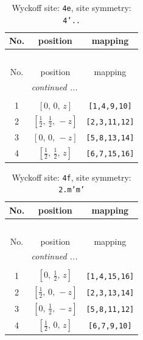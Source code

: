\documentclass[fleqn,8pt]{jsarticle}
\begin{document}
\begin{longtable}{ccc}
\caption{Wyckoff site: {\tt 4e}, site symmetry: {\tt 4'..}}
 \\
 \hline \hline
No. & position & mapping \\ \hline \endfirsthead

\multicolumn{2}{l}{\tablename\ \thetable{}} \\
 \hline \hline
No. & position & mapping \\ \hline \endhead

 \hline \hline
\multicolumn{2}{r}{\footnotesize\it continued ...} \\ \endfoot

 \hline \hline
\multicolumn{2}{r}{} \\ \endlastfoot

1 & $\left[ 0,\, 0,\, z \right]$ & {\tt [1,4,9,10]} \\ \hline
2 & $\left[ \frac{1}{2},\, \frac{1}{2},\, - z \right]$ & {\tt [2,3,11,12]} \\ \hline
3 & $\left[ 0,\, 0,\, - z \right]$ & {\tt [5,8,13,14]} \\ \hline
4 & $\left[ \frac{1}{2},\, \frac{1}{2},\, z \right]$ & {\tt [6,7,15,16]} \\
\end{longtable}
\renewcommand{\arraystretch}{1.2}
\begin{longtable}{ccc}
\caption{Wyckoff site: {\tt 4f}, site symmetry: {\tt 2.m'm'}}
 \\
 \hline \hline
No. & position & mapping \\ \hline \endfirsthead

\multicolumn{2}{l}{\tablename\ \thetable{}} \\
 \hline \hline
No. & position & mapping \\ \hline \endhead

 \hline \hline
\multicolumn{2}{r}{\footnotesize\it continued ...} \\ \endfoot

 \hline \hline
\multicolumn{2}{r}{} \\ \endlastfoot

1 & $\left[ 0,\, \frac{1}{2},\, z \right]$ & {\tt [1,4,15,16]} \\ \hline
2 & $\left[ \frac{1}{2},\, 0,\, - z \right]$ & {\tt [2,3,13,14]} \\ \hline
3 & $\left[ 0,\, \frac{1}{2},\, - z \right]$ & {\tt [5,8,11,12]} \\ \hline
4 & $\left[ \frac{1}{2},\, 0,\, z \right]$ & {\tt [6,7,9,10]} \\
\end{longtable}
\end{document}
